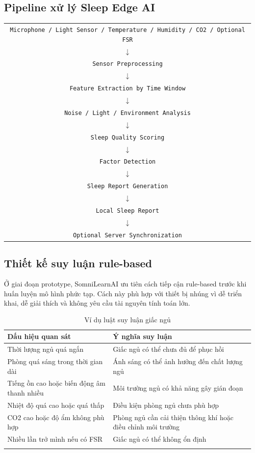 \documentclass[12pt,a4paper]{article}
\begin{document}
\subsection{Pipeline xử lý Sleep Edge AI}

\begin{center}
\begin{tabular}{c}
\texttt{Microphone / Light Sensor / Temperature / Humidity / CO2 / Optional FSR} \\
$\downarrow$ \\
\texttt{Sensor Preprocessing} \\
$\downarrow$ \\
\texttt{Feature Extraction by Time Window} \\
$\downarrow$ \\
\texttt{Noise / Light / Environment Analysis} \\
$\downarrow$ \\
\texttt{Sleep Quality Scoring} \\
$\downarrow$ \\
\texttt{Factor Detection} \\
$\downarrow$ \\
\texttt{Sleep Report Generation} \\
$\downarrow$ \\
\texttt{Local Sleep Report} \\
$\downarrow$ \\
\texttt{Optional Server Synchronization}
\end{tabular}
\end{center}

\subsection{Thiết kế suy luận rule-based}

Ở giai đoạn prototype, SomniLearnAI ưu tiên cách tiếp cận rule-based trước khi huấn luyện mô hình phức tạp. Cách này phù hợp với thiết bị nhúng vì dễ triển khai, dễ giải thích và không yêu cầu tài nguyên tính toán lớn.

\begin{longtable}{|P{6cm}|P{8.5cm}|}
\hline
\textbf{Dấu hiệu quan sát} & \textbf{Ý nghĩa suy luận} \\
\hline
Thời lượng ngủ quá ngắn & Giấc ngủ có thể chưa đủ để phục hồi \\
\hline
Phòng quá sáng trong thời gian dài & Ánh sáng có thể ảnh hưởng đến chất lượng ngủ \\
\hline
Tiếng ồn cao hoặc biến động âm thanh nhiều & Môi trường ngủ có khả năng gây gián đoạn \\
\hline
Nhiệt độ quá cao hoặc quá thấp & Điều kiện phòng ngủ chưa phù hợp \\
\hline
CO2 cao hoặc độ ẩm không phù hợp & Phòng ngủ cần cải thiện thông khí hoặc điều chỉnh môi trường \\
\hline
Nhiều lần trở mình nếu có FSR & Giấc ngủ có thể không ổn định \\
\hline
\caption{Ví dụ luật suy luận giấc ngủ}
\end{longtable}
\end{document}
